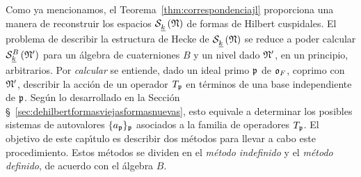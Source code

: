 Como ya mencionamos, el Teorema~\ref{thm:correspondenciajl} proporciona una
manera de reconstruir los espacios $\spitzH{k}{\frak{N}}$ de formas de Hilbert
cuspidales. El problema de describir la estructura de Hecke de
$\spitzH{k}{\frak{N}}$ se reduce a poder calcular $\spitzH[B]{k}{\frak{N}'}$
para un \'{a}lgebra de cuaterniones $B$ y un nivel dado $\frak{N}'$, en un
principio, arbitrarios. Por \emph{calcular} se entiende, dado un ideal primo
$\frak{p}$ de $\oka{F}$, coprimo con $\frak{N}'$, describir la acci\'{o}n de un
operador $T_{\frak{p}}$ en t\'{e}rminos de una base independiente de
$\frak{p}$. Seg\'{u}n lo desarrollado en la Secci\'{o}n
\S~\ref{sec:dehilbertformasviejasformasnuevas}, esto equivale a determinar los
posibles sistemas de autovalores $\{a_{\frak{p}}\}_{\frak{p}}$ asociados a la
familia de operadores $T_{\frak{p}}$.
El objetivo de este cap\'{\i}tulo es describir dos m\'{e}todos para llevar a
cabo este procedimiento. Estos m\'{e}todos se dividen en el \emph{m\'{e}todo %
indefinido} y el \emph{m\'{e}todo definido}, de acuerdo con el \'{a}lgebra $B$.
